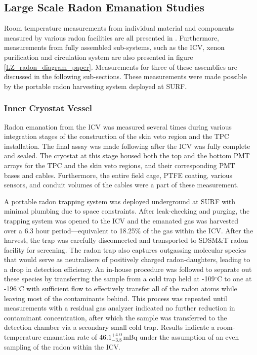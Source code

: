 \subsection{Large Scale Radon Emanation Studies}
\label{secsec:large_scale_measurements}

Room temperature measurements from individual material and components measured by various radon facilities are all presented in \cite{lz_screening}. Furthermore, measurements from fully assembled sub-systems, such as the ICV, xenon purification and circulation system are also presented in figure \ref{LZ_radon_diagram_paper}. Measurements for three of these assemblies are discussed in the following sub-sections. These measurements were made possible by the portable radon harvesting system deployed at SURF. 

\subsubsection{Inner Cryostat Vessel}

Radon emanation from the ICV was measured several times during various integration stages of the construction of the skin veto region and the TPC installation. The final assay was made following after the ICV was fully complete and sealed. The cryostat at this stage housed both the top and the bottom PMT arrays for the TPC and the skin veto regions, and their corresponding PMT bases and cables. Furthermore, the entire field cage, PTFE coating, various sensors, and conduit volumes of the cables were a part of these measurement.

A portable radon trapping system was deployed underground at SURF with minimal plumbing due to space constraints. After leak-checking and purging, the trapping system was opened to the ICV and the emanated gas was harvested over a 6.3 hour period---equivalent to 18.25\% of the gas within the ICV. After the harvest, the trap was carefully disconnected and transported to SDSM\&T radon facility for screening. The radon trap also captures outgassing molecular species that would serve as neutralisers of positively charged radon-daughters, leading to a drop in detection efficiency. An in-house procedure was followed to separate out these species by transferring the sample from a cold trap held at -109$^{\circ{}}$C to one at -196$^{\circ{}}$C with sufficient flow to effectively transfer all of the radon atoms while leaving most of the contaminants behind. This process was repeated until measurements with a residual gas analyzer indicated no further reduction in contaminant concentration, after which the sample was transferred to the detection chamber via a secondary small cold trap. Results indicate a room-temperature emanation rate of $46.1^{+4.0}_{-3.8}\,$mBq under the assumption of an even sampling of the radon within the ICV.


